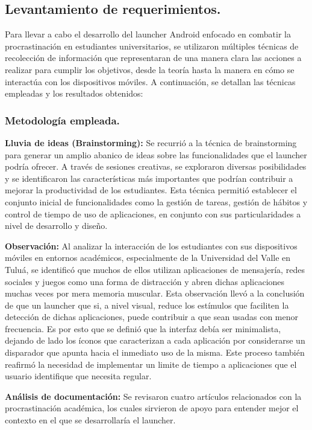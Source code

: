 \subsection{Levantamiento de requerimientos.}

Para llevar a cabo el desarrollo del launcher Android enfocado en combatir la procrastinación en estudiantes universitarios, se utilizaron múltiples técnicas de recolección de información que representaran de una manera clara las acciones a realizar para cumplir los objetivos, desde la teoría hasta la manera en cómo se interactúa con los dispositivos móviles. A continuación, se detallan las técnicas empleadas y los resultados obtenidos:

\subsubsection{Metodología empleada.}

\textbf{Lluvia de ideas (Brainstorming):} Se recurrió a la técnica de brainstorming para generar un amplio abanico de ideas sobre las funcionalidades que el launcher podría ofrecer. A través de sesiones creativas, se exploraron diversas posibilidades y se identificaron las características más importantes que podrían contribuir a mejorar la productividad de los estudiantes. Esta técnica permitió establecer el conjunto inicial de funcionalidades como la gestión de tareas, gestión de hábitos y control de tiempo de uso de aplicaciones, en conjunto con sus particularidades a nivel de desarrollo y diseño.

\textbf{Observación:} Al analizar la interacción de los estudiantes con sus dispositivos móviles en entornos académicos, especialmente de la Universidad del Valle en Tuluá, se identificó que muchos de ellos utilizan aplicaciones de mensajería, redes sociales y juegos como una forma de distracción y abren dichas aplicaciones muchas veces por mera memoria muscular. Esta observación llevó a la conclusión de que un launcher que si, a nivel visual, reduce los estímulos que faciliten la detección de dichas aplicaciones, puede contribuir a que sean usadas con menor frecuencia. Es por esto que se definió que la interfaz debía ser minimalista, dejando de lado los íconos que caracterizan a cada aplicación por considerarse un disparador que apunta hacia el inmediato uso de la misma. Este proceso también reafirmó la necesidad de implementar un limite de tiempo a aplicaciones que el usuario identifique que necesita regular.

\textbf{Análisis de documentación:} Se revisaron cuatro artículos relacionados con la procrastinación académica, los cuales sirvieron de apoyo para entender mejor el contexto en el que se desarrollaría el launcher.

